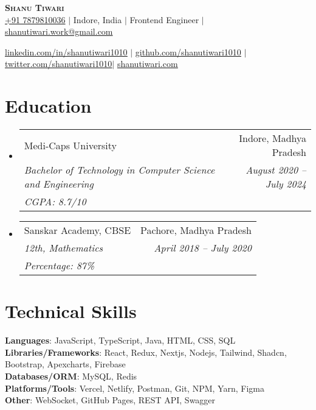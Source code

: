 \documentclass[letterpaper,10pt]{article}
\makeatletter
\newcommand{\resumeEduheading}[5]{
    \vspace{2pt}\item
      \begin{tabular*}{0.97\textwidth}[t]{l@{\extracolsep{\fill}}r}
        {#1} & #2 \\
        \textit{\small#3} & \textit{\small #4}\\
        \textit{\small#5} \\
      \end{tabular*}\vspace{-7pt}
  }
\newcommand{\resumeSubHeadingListStart}{\begin{itemize}[leftmargin=0.15in, label={}]}
\newcommand{\resumeSubHeadingListEnd}{\end{itemize}}
\makeatother
\begin{document}

\begin{center}
  \textbf{\Huge \scshape Shanu Tiwari} \\ \vspace{1pt}
  \href{tel:7879810036}{+91 7879810036} $|$
  {Indore, India} $|$
  {Frontend Engineer} $|$
  \href{mailto:shanutiwari.work@gmail.com}{shanutiwari.work@gmail.com} \\ \vspace{1pt}

  \href{https://linkedin.com/in/shanutiwari1010}{\underline{linkedin.com/in/shanutiwari1010}} $|$
  \href{https://github.com/shanutiwari1010}{\underline{github.com/shanutiwari1010}} $|$
  \href{https://twitter.com/shanutiwari1010}{\underline{twitter.com/shanutiwari1010}}$|$
   \href{https://shanutiwari.com/}{\underline{shanutiwari.com}} 
  
\end{center}

\section{Education}
\resumeSubHeadingListStart
\resumeEduheading
{Medi-Caps University}{Indore, Madhya Pradesh}
{Bachelor of Technology in Computer Science and Engineering}{August 2020 -- July 2024}
{CGPA: 8.7/10}
\resumeEduheading
{Sanskar Academy, CBSE}{Pachore, Madhya Pradesh}
{12th, Mathematics}{April 2018 -- July 2020}
{Percentage: 87\%}
\resumeSubHeadingListEnd

\section{Technical Skills}
\begin{itemize}[leftmargin=0.15in, label={}]
  \small{\item{
        \textbf{Languages}{: \hfill JavaScript, TypeScript, Java, HTML, CSS, SQL \hfill} \\
        \vspace{3pt}\textbf{Libraries/Frameworks}{: \hfill React, Redux, Nextjs, Nodejs, Tailwind, Shadcn, Bootstrap, Apexcharts, Firebase \hfill} \\
        \vspace{3pt}\textbf{Databases/ORM}{: \hfill MySQL, Redis \hfill} \\
        \vspace{3pt}\textbf{Platforms/Tools}{: \hfill Vercel, Netlify, Postman, Git, NPM, Yarn, Figma \hfill} \\
        \vspace{3pt}\textbf{Other}{: \hfill WebSocket, GitHub Pages, REST API, Swagger \hfill} \\
        }}
\end{itemize}
\end{document}
